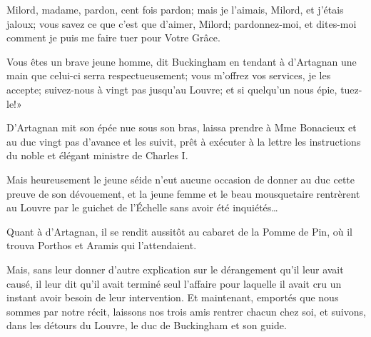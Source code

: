 \speak  Milord, madame, pardon, cent fois pardon; mais je l'aimais, Milord, et j'étais jaloux; vous savez ce que c'est que d'aimer, Milord; pardonnez-moi, et dites-moi comment je puis me faire tuer pour Votre Grâce. 

\speak  Vous êtes un brave jeune homme, dit Buckingham en tendant à d'Artagnan une main que celui-ci serra respectueusement; vous m'offrez vos services, je les accepte; suivez-nous à vingt pas jusqu'au Louvre; et si quelqu'un nous épie, tuez-le!» 

D'Artagnan mit son épée nue sous son bras, laissa prendre à Mme Bonacieux et au duc vingt pas d'avance et les suivit, prêt à exécuter à la lettre les instructions du noble et élégant ministre de Charles I\ier. 

Mais heureusement le jeune séide n'eut aucune occasion de donner au duc cette preuve de son dévouement, et la jeune femme et le beau mousquetaire rentrèrent au Louvre par le guichet de l'Échelle sans avoir été inquiétés\dots 

Quant à d'Artagnan, il se rendit aussitôt au cabaret de la Pomme de Pin, où il trouva Porthos et Aramis qui l'attendaient. 

Mais, sans leur donner d'autre explication sur le dérangement qu'il leur avait causé, il leur dit qu'il avait terminé seul l'affaire pour laquelle il avait cru un instant avoir besoin de leur intervention. Et maintenant, emportés que nous sommes par notre récit, laissons nos trois amis rentrer chacun chez soi, et suivons, dans les détours du Louvre, le duc de Buckingham et son guide.